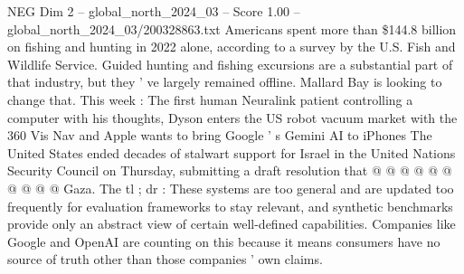 \begin{textsample}{NEG Dim 2 – global\_north\_2024\_03 – Score 1.00 – global\_north\_2024\_03/200328863.txt}
Americans spent more than \$144.8 billion on fishing and hunting in 2022 alone, according to a survey by the U.S.
Fish and Wildlife Service.
Guided hunting and fishing excursions are a substantial part of that industry, but they ' ve largely remained offline.
Mallard Bay is looking to change that.
This week : The first human Neuralink patient controlling a computer with his thoughts, Dyson enters the US robot vacuum market with the 360 Vis Nav and Apple wants to bring Google ' s Gemini AI to iPhones The United States ended decades of stalwart support for Israel in the United Nations Security Council on Thursday, submitting a draft resolution that @ @ @ @ @ @ @ @ @ @ Gaza.
The tl ; dr : These systems are too general and are updated too frequently for evaluation frameworks to stay relevant, and synthetic benchmarks provide only an abstract view of certain well-defined capabilities.
Companies like Google and OpenAI are counting on this because it means consumers have no source of truth other than those companies ' own claims.

\end{textsample}
